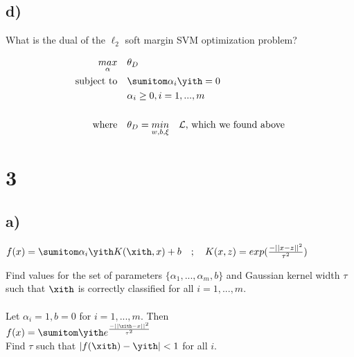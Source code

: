 \documentclass[11pt]{article}
\begin{document}
\subsection*{d)}

What is the dual of the $\ell_2$ soft margin SVM optimization problem?

\begin{align*}
  \underset{\alpha}{max} &\quad \theta_D \\
  \text{subject to}      &\quad \sumitom \alpha_i \yith = 0 \\
                         &\quad \alpha_i \geq 0, i=1,...,m \\
                         \\
  \text{where}           &\quad \theta_D = \underset{w,b,\xi}{min} \quad \mathcal{L} \text{, which we found above} \\
\end{align*}

\section*{3}

\subsection*{a)}

$f(x) = \sumitom \alpha_i \yith K(\xith,x) + b  \quad ; \quad  K(x,z) = exp(\frac{-||x-z||^2}{\tau^2})$

Find values for the set of parameters $\{\alpha_1,...,\alpha_m,b\}$ and Gaussian kernel width $\tau$ such that $\xith$ is correctly classified for all $i = 1,...,m$. \\\\

Let $\alpha_i = 1, b = 0$ for $i = 1,...,m$. Then \\

$f(x) = \sumitom \yith e^{\frac{-||\xith - x||^2}{\tau^2}}$ \\

Find $\tau$ such that $|f(\xith) - \yith| < 1$ for all $i$.
\end{document}
